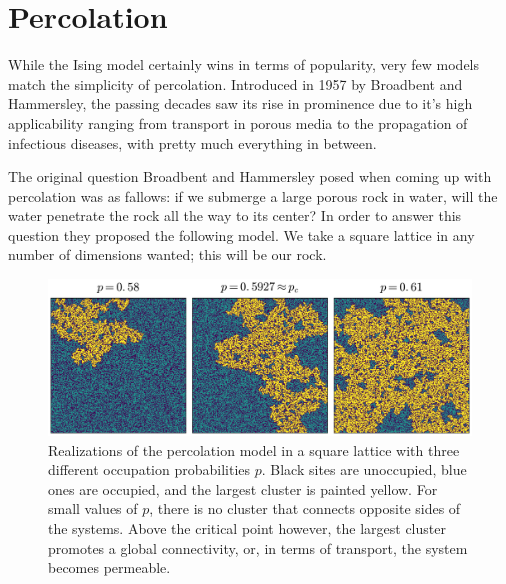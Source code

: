 \section{Percolation}
\label{sec:perc}

While the Ising model certainly wins in terms of popularity, very few models
match the simplicity of percolation. Introduced in 1957 by Broadbent and
Hammersley, the passing decades saw its rise in prominence due to it's high
applicability ranging from transport in porous media to the propagation of
infectious diseases, with pretty much everything in between.

The original question Broadbent and Hammersley posed when coming up with
percolation was as fallows: if we submerge a large porous rock in water, will
the water penetrate the rock all the way to its center? In order to answer this
question they proposed the following model. We take a square lattice in any
number of dimensions wanted; this will be our rock.

\begin{figure}
\begin{center}
    \includegraphics[scale=0.4]{chapters/ch2-crit/figs/isoperco}
\end{center}
\caption{Realizations of the percolation model in a square lattice with three
    different occupation probabilities $p$. Black sites are unoccupied, blue
    ones are occupied, and the largest cluster is painted yellow. For small
    values of $p$, there is no cluster that connects opposite sides of the
    systems. Above the critical point however, the largest cluster promotes a
    global connectivity, or, in terms of transport, the system becomes
    permeable.}
\label{fig:isoperco}
\end{figure}

